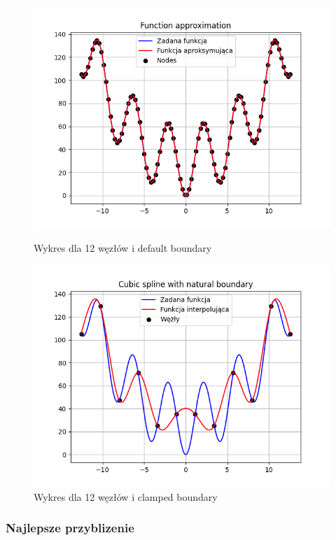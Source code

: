 \documentclass{article}
\begin{document}
\begin{figure}[H]
  \begin{minipage}[b]{0.49\textwidth}
    \includegraphics[width=\textwidth]{img28.png}
    \caption{Wykres dla 12 węzłów i default boundary}
  \end{minipage}
  \hfill
  \begin{minipage}[b]{0.49\textwidth}
    \includegraphics[width=\textwidth]{img29.png}
    \caption{Wykres dla 12 węzłów i clamped boundary}
  \end{minipage}
\end{figure}

\subsubsection{Najlepsze przyblizenie}
\end{document}
